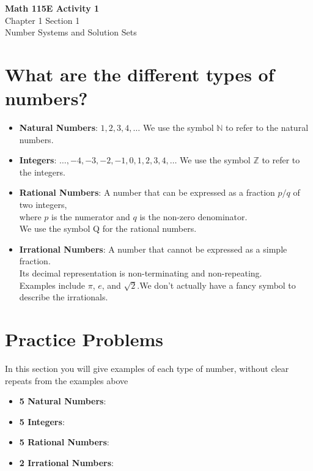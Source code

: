 \documentclass{article}
\begin{document}
\begin{center}
    \Large \textbf{Math 115E Activity 1} \\
    \vspace{0.2cm}
    \normalsize Chapter 1 Section 1 \\
    \normalsize Number Systems and Solution Sets
\end{center}
\vspace{1cm} %

\section*{What are the different types of numbers?}
\begin{itemize}
    \item \textbf{Natural Numbers}: $1, 2, 3, 4, \ldots$ We use the
symbol $\mathbb{N}$ to refer to the natural numbers.
    
    \item \textbf{Integers}: $\ldots, -4, -3, -2, -1, 0, 1, 2, 3, 4, \ldots$ We use the symbol $\mathbb{Z}$ to refer to the integers.

    \item \textbf{Rational Numbers}: A number that can be expressed as a fraction $p/q$ of two integers, \\
    where $p$ is the numerator and $q$ is the non-zero denominator. \\
    We use the symbol Q for the rational numbers.
    
    \item \textbf{Irrational Numbers}: A number that cannot be expressed as a simple fraction. \\
    Its decimal representation is non-terminating and non-repeating. \\
    Examples include $\pi$, $e$, and $\sqrt{2}$.We don’t actually have a
    fancy symbol to describe the irrationals.

\end{itemize}

\vspace{0.5cm} %

\section*{Practice Problems}
In this section you will give examples of each type of number, without clear repeats from the examples above
\begin{itemize}
    \item \textbf{5 Natural Numbers}: 
    \vspace{0.5cm}
    \item \textbf{5 Integers}: 
    \vspace{0.5cm}
    \item \textbf{5 Rational Numbers}: 
    \vspace{0.5cm}
    \item \textbf{2 Irrational Numbers}: 
    \vspace{0.5cm}
\end{itemize}
\end{document}
